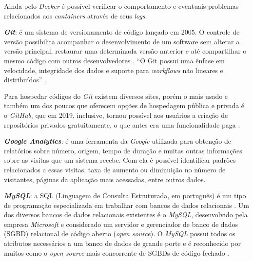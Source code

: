 Ainda pelo \textit{Docker} é possível verificar o comportamento e eventuais problemas relacionados aos \textit{containers} através de seus \textit{logs}.

\textbf{\textit{Git}}: é um sistema de versionamento de código lançado em 2005. O controle de versão possibilita acompanhar o desenvolvimento de um
software sem alterar a versão principal, restaurar uma determinada versão anterior e até compartilhar o mesmo código com outros desenvolvedores 
. ``O Git possui uma ênfase em velocidade, integridade dos dados e suporte para \textit{workflows} não lineares e distribuídos''
\cite[p. 10]{ghezzi2015api}.

Para hospedar códigos do \textit{Git} existem diversos sites, porém o mais usado e também um dos poucos que oferecem opções de hospedagem pública e privada é o \textit{GitHub}, que em 2019, inclusive, tornou possível aos usuários a criação de repositórios privados gratuitamente, o que antes era uma funcionalidade paga . 

\textbf{\textit{Google Analytics}}: é uma ferramenta da \textit{Google} utilizada para obtenção de relatórios sobre número, origem, tempo de duração e muitas outras informações sobre as visitas que um sistema recebe. Com ela é possível identificar padrões relacionados a essas visitas, taxa de aumento ou diminuição no número de visitantes, páginas da aplicação mais acessadas, entre outros dados. 

\textbf{\textit{MySQL}}: a SQL (Linguagem de Consulta Estruturada, em português) é um tipo de programação especializada em trabalhar com bancos de dados relacionais \cite[~p. 7, tradução nossa]{mysql2001mysql}. Um dos diversos bancos de dados relacionais existentes é o \textit{MySQL}, desenvolvido pela empresa \textit{Microsoft} e considerado um servidor e gerenciador de banco de dados (SGBD) relacional de código aberto (\textit{open source}). O \textit{MySQL} possui todos os atributos necessários a um banco de dados de grande porte e é reconhecido por muitos como o \textit{open source} mais concorrente de SGBDs de código fechado .


\hspace{2.5cm}

